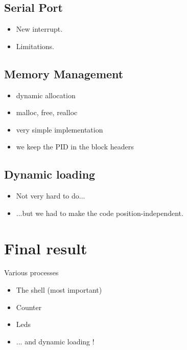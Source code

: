 \documentclass{beamer}
\begin{document}
    \subsection{Serial Port}

    \begin{frame}
      \begin{itemize}
        \item New interrupt.
        \item Limitations.
      \end{itemize}
    \end{frame}

    \subsection{Memory Management}
    
    \begin{frame}
      \begin{itemize}
        \item dynamic allocation
        \item malloc, free, realloc
        \item very simple implementation
        \item we keep the PID in the block headers
      \end{itemize}
    \end{frame}

    \subsection{Dynamic loading}
 
    \begin{frame}
      \begin{itemize}
        \item Not very hard to do...
        \item ...but we had to make the code position-independent.
      \end{itemize}
    \end{frame}

  \section{Final result}
 
  \begin{frame}{Various processes}
      \begin{itemize}
        \item The shell (most important)
        \item Counter
        \item Leds
        \item ... and dynamic loading !
      \end{itemize}
  \end{frame}
\end{document}
